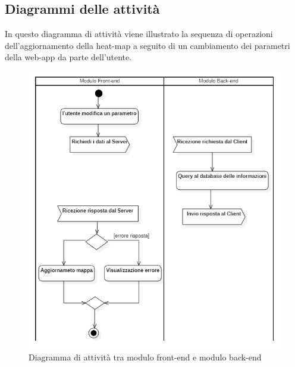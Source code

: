 \subsection{Diagrammi delle attività}
In questo diagramma di attività viene illustrato la sequenza di operazioni dell'aggiornamento della heat-map a seguito di un cambiamento dei parametri della web-app da parte dell'utente.
\begin{center}
	\begin{figure}[H]
		\centering\includegraphics[scale=0.8]{../immagini/diag_PB/diag_act_front_back.png}
		\caption{Diagramma di attività tra modulo front-end e modulo back-end}
	\end{figure}
\end{center}
